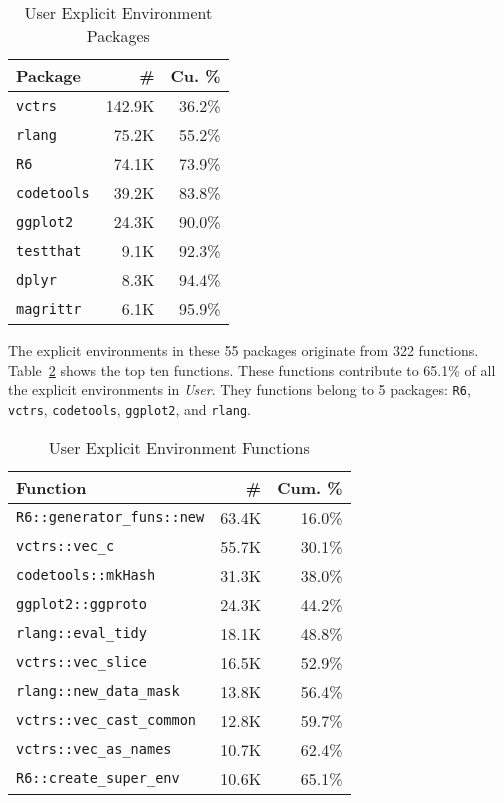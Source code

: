\documentclass[10pt,review,sigplan,anonymous=true,authorversion=true,nonacm=true]{acmart}
\newcommand{\code}[1]{\lstinline |#1|\xspace}
\begin{document}
\begin{table}[!h]
  \small
  \caption{User Explicit Environment Packages} \label{table:user_explicit_pack}
  \centering
  \begin{tabular}{lrr}
    \toprule
    \textbf{Package}&\textbf{\#}&\textbf{Cu. \%}\\
    \midrule
    \code{vctrs}&142.9K&36.2\%\\
    \code{rlang}&75.2K&55.2\%\\
    \code{R6}&74.1K&73.9\%\\
    \code{codetools}&39.2K&83.8\%\\
    \code{ggplot2}&24.3K&90.0\%\\
    \code{testthat}&9.1K&92.3\%\\
    \code{dplyr}&8.3K&94.4\%\\
    \code{magrittr}&6.1K&95.9\%\\
    \bottomrule
  \end{tabular}
\end{table}

The explicit environments in these 55 packages originate from 322 functions.
Table~\ref{table:user_explicit_fun} shows the top ten functions. These functions
contribute to 65.1\% of all the explicit environments in \emph{User}. They
functions belong to 5 packages: \code{R6}, \code{vctrs}, \code{codetools},
\code{ggplot2}, and \code{rlang}.

\begin{table}[!h]
  \vspace{-3mm}
  \small
  \caption{User Explicit Environment Functions} \label{table:user_explicit_fun}
  \centering
  \begin{tabular}{lrr}
    \toprule
    \textbf{Function}&\textbf{\#}&\textbf{Cum. \%}\\
    \midrule
    \code{R6::generator_funs::new}&63.4K&16.0\%\\
    \code{vctrs::vec_c}&55.7K&30.1\%\\
    \code{codetools::mkHash}&31.3K&38.0\%\\
    \code{ggplot2::ggproto}&24.3K&44.2\%\\
    \code{rlang::eval_tidy}&18.1K&48.8\%\\
    \code{vctrs::vec_slice}&16.5K&52.9\%\\
    \code{rlang::new_data_mask}&13.8K&56.4\%\\
    \code{vctrs::vec_cast_common}&12.8K&59.7\%\\
    \code{vctrs::vec_as_names}&10.7K&62.4\%\\
    \code{R6::create_super_env}&10.6K&65.1\%\\
    \bottomrule
  \end{tabular}
\end{table}
\end{document}
